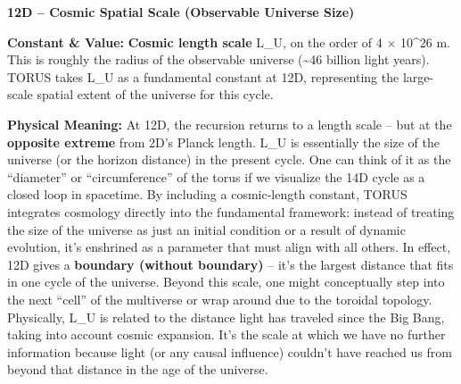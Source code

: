 \documentclass[
]{article}
\begin{document}
\textbf{12D -- Cosmic Spatial Scale (Observable Universe Size)}

\textbf{Constant \& Value:} \textbf{Cosmic length scale} L\_U, on the
order of 4 × 10\^{}26 m\hspace{0pt}. This is roughly the radius of the
observable universe (\textasciitilde46 billion light years). TORUS takes
L\_U as a fundamental constant at 12D, representing the large-scale
spatial extent of the universe for this cycle.

\textbf{Physical Meaning:} At 12D, the recursion returns to a length
scale -- but at the \textbf{opposite extreme} from 2D's Planck length.
L\_U is essentially the size of the universe (or the horizon distance)
in the present cycle\hspace{0pt}. One can think of it as the
``diameter'' or ``circumference'' of the torus if we visualize the 14D
cycle as a closed loop in spacetime\hspace{0pt}. By including a
cosmic-length constant, TORUS integrates cosmology directly into the
fundamental framework: instead of treating the size of the universe as
just an initial condition or a result of dynamic evolution, it's
enshrined as a parameter that must align with all others. In effect, 12D
gives a \textbf{boundary (without boundary)} -- it's the largest
distance that fits in one cycle of the universe. Beyond this scale, one
might conceptually step into the next ``cell'' of the multiverse or wrap
around due to the toroidal topology. Physically, L\_U is related to the
distance light has traveled since the Big Bang, taking into account
cosmic expansion. It's the scale at which we have no further information
because light (or any causal influence) couldn't have reached us from
beyond that distance in the age of the universe.
\end{document}
